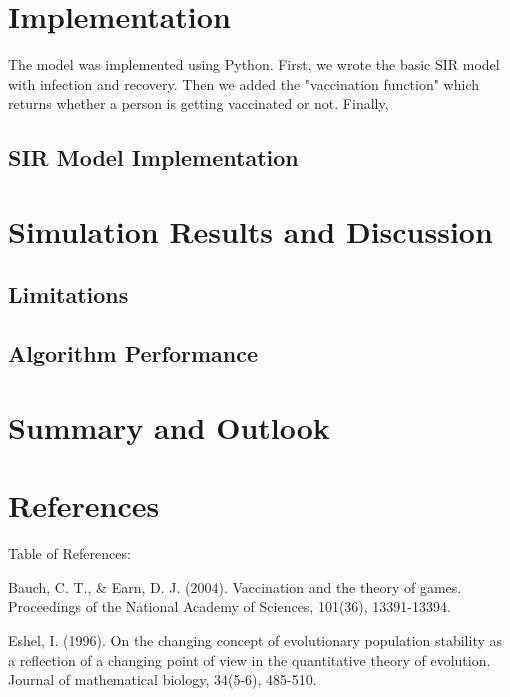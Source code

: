 \documentclass[11pt]{article}
\begin{document}
\section{Implementation}
The model was implemented using Python. First, we wrote the basic SIR model with infection and recovery. Then we added the "vaccination function" which returns whether a person is getting vaccinated or not. Finally, 

\vspace{14px}



\subsection{SIR Model Implementation}


\section{Simulation Results and Discussion}

\subsection{Limitations}

\subsection{Algorithm Performance}

\section{Summary and Outlook}

\section{References}
Table of References: 
\vspace{14px}

Bauch, C. T., \& Earn, D. J. (2004). Vaccination and the theory of games. Proceedings of the National Academy of Sciences, 101(36), 13391-13394.
\vspace{14px}

Eshel, I. (1996). On the changing concept of evolutionary population stability as a reflection of a changing point of view in the quantitative theory of evolution. Journal of mathematical biology, 34(5-6), 485-510.
\vspace{14px}
\end{document}
